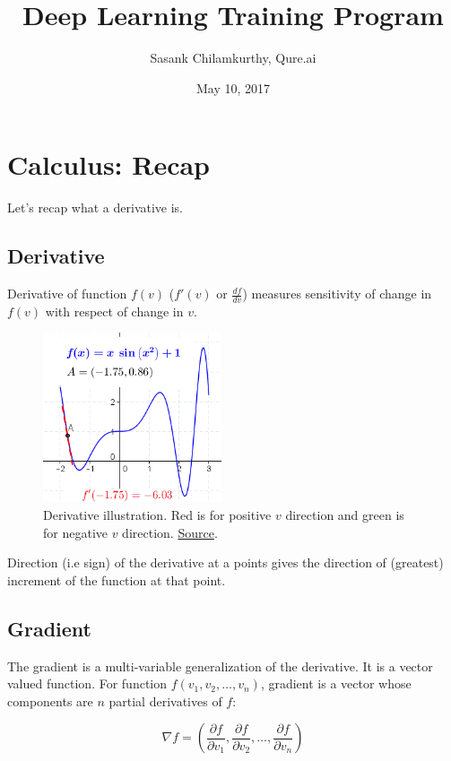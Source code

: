 \documentclass[a4paper]{tufte-handout}
\title{Deep Learning Training Program}
\author{Sasank Chilamkurthy, Qure.ai}
\date{May 10, 2017}
\begin{document}
\maketitle

\section{Calculus: Recap}\label{calculus-recap}

Let's recap what a derivative is.

\subsection{Derivative}\label{derivative}

Derivative of function \(f(v)\) (\(f'(v)\) or \(\frac{df}{dv}\))
measures sensitivity of change in \(f(v)\) with respect of change in
\(v\).

\begin{figure}
  \includegraphics[height=50mm]{differential.png}
  \caption{Derivative illustration. Red is for positive \(v\)
direction and green is for negative \(v\) direction.
\href{https://en.wikipedia.org/wiki/Derivative}{Source}.}
\end{figure}

Direction (i.e sign) of the derivative at a points gives the direction
of (greatest) increment of the function at that point.

\subsection{Gradient}\label{gradient}

The gradient is a multi-variable generalization of the derivative. It is
a vector valued function. For function \(f(v_1, v_2, \ldots, v_n)\),
gradient is a vector whose components are \(n\) partial derivatives of
\(f\):

\[ \nabla f = (\frac{\partial f}{\partial v_1 }, \frac{\partial f}{\partial v_2 }, \ldots, \frac{\partial f}{\partial v_n })\]
\end{document}
